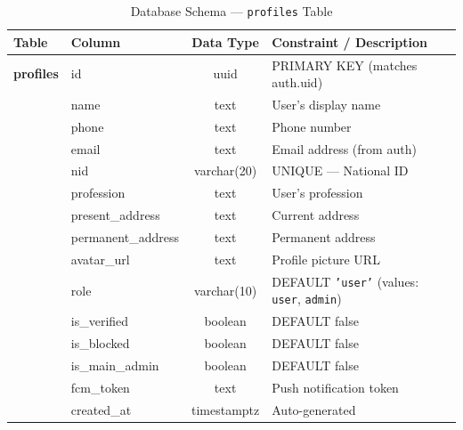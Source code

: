 \documentclass[11pt, a4paper]{report}
\begin{document}
\begin{table}[ht]
\centering
\caption{Database Schema --- \texttt{profiles} Table}
\label{tab:profiles}
\begin{tabularx}{\textwidth}{llcX}
\toprule
\textbf{Table} & \textbf{Column} & \textbf{Data Type} & \textbf{Constraint / Description} \\
\midrule
\textbf{profiles} & id & uuid & PRIMARY KEY (matches auth.uid) \\
& name & text & User's display name \\
& phone & text & Phone number \\
& email & text & Email address (from auth) \\
& nid & varchar(20) & UNIQUE --- National ID \\
& profession & text & User's profession \\
& present\_address & text & Current address \\
& permanent\_address & text & Permanent address \\
& avatar\_url & text & Profile picture URL \\
& role & varchar(10) & DEFAULT \texttt{'user'} (values: \texttt{user}, \texttt{admin}) \\
& is\_verified & boolean & DEFAULT false \\
& is\_blocked & boolean & DEFAULT false \\
& is\_main\_admin & boolean & DEFAULT false \\
& fcm\_token & text & Push notification token \\
& created\_at & timestamptz & Auto-generated \\
\bottomrule
\end{tabularx}
\end{table}
\end{document}

